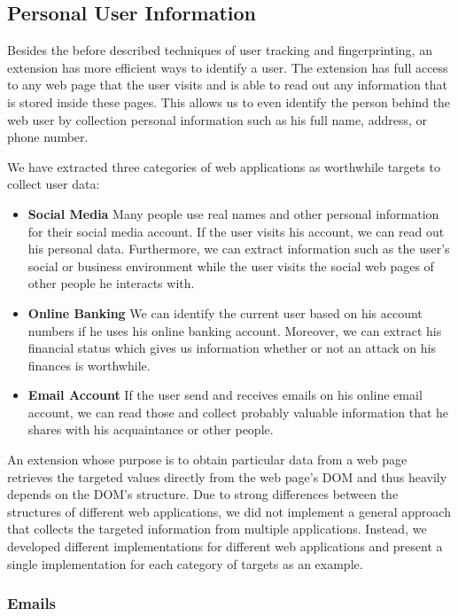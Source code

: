 \subsection{Personal User Information}
	
	Besides the before described techniques of user tracking and fingerprinting, an extension has more efficient ways to identify a user. The extension has full access to any web page that the user visits and is able to read out any information that is stored inside these pages. This allows us to even identify the person behind the web user by collection personal information such as his full name, address, or phone number. 
	
	We have extracted three categories of web applications as worthwhile targets to collect user data:
	\begin{itemize}
		\item \textbf{Social Media} Many people use real names and other personal information for their social media account. If the user visits his account, we can read out his personal data. Furthermore, we can extract information such as the user's social or business environment while the user visits the social web pages of other people he interacts with.
		\item \textbf{Online Banking} We can identify the current user based on his account numbers if he uses his online banking account. Moreover, we can extract his financial status which gives us information whether or not an attack on his finances is worthwhile.
		\item \textbf{Email Account} If the user send and receives emails on his online email account, we can read those and collect probably valuable information that he shares with his acquaintance or other people.
	\end{itemize}
	
	An extension whose purpose is to obtain particular data from a web page retrieves the targeted values directly from the web page's DOM and thus heavily depends on the DOM's structure. Due to strong differences between the structures of different web applications, we did not implement a general approach that collects the targeted information from multiple applications. Instead, we developed different implementations for different web applications and present a single implementation for each category of targets as an example.
	
\subsubsection{Emails}
		
